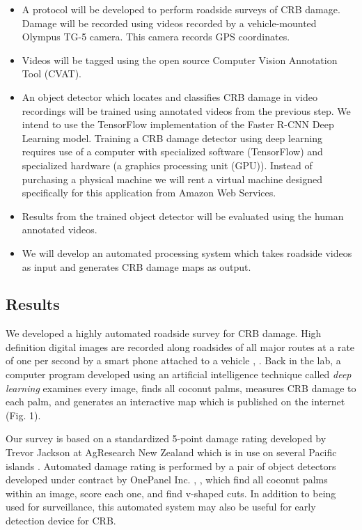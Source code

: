 \documentclass[12pt,letterpaper,english,bibliography=totocnumbered,abstract=on]{scrartcl}
\begin{document}
\begin{framed}
\begin{itemize}
	\item A protocol will be developed to perform roadside surveys of CRB damage. Damage will be recorded using videos recorded by a vehicle-mounted Olympus TG-5 camera. This camera records GPS coordinates.
	\item Videos will be tagged using the open source Computer Vision Annotation Tool (CVAT).
	\item An object detector which locates and classifies CRB damage in video recordings will be trained using annotated videos from the previous step. We intend to use the TensorFlow implementation of the Faster R-CNN Deep Learning model. Training a CRB damage detector using deep learning requires use of a computer with specialized software (TensorFlow) and specialized hardware (a graphics processing unit (GPU)). Instead of purchasing a physical machine we will rent a virtual machine designed specifically for this application from Amazon Web Services.
	\item Results from the trained object detector will be evaluated using the human annotated videos.
	\item We will develop an automated processing system which takes roadside videos as input and generates CRB damage maps as output.
\end{itemize}
\end{framed}

\subsection{Results}

We developed a highly automated roadside survey for CRB damage.
High definition digital images are recorded along roadsides of all major routes at a rate of one per second by a smart phone attached to a vehicle \cite{mooreSetAutomatedRoadside2020}, \cite{mooreYouTubeVideoMounting2020}. Back in the lab, a computer program developed using an artificial intelligence technique called \emph{deep learning} examines every image, finds all coconut palms, measures CRB damage to each palm, and generates an interactive map which is published on the internet (Fig. 1).

Our survey is based on a standardized 5-point damage rating developed by Trevor Jackson at AgResearch New Zealand which is in use on several Pacific islands \cite{mooreAutomatedRoadsideVideo2020}. Automated damage rating is performed by a pair of object detectors developed under contract by OnePanel Inc. \cite{mooreRequestInterestObject2020}, \cite{onepanelinc.ScopeWorkObject2020}, \cite{onepanelinc.AIPipelineOperations2020} which find all coconut palms within an image, score each one, and find v-shaped cuts. In addition to being used for surveillance, this automated system may also be useful for early detection device for CRB.
\end{document}

